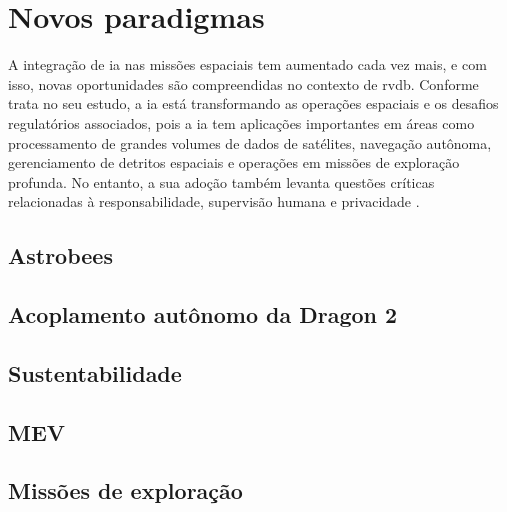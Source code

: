 \section{Novos paradigmas}

A integração de \gls{ia} nas missões espaciais tem aumentado cada vez mais, e com isso, novas oportunidades são compreendidas no contexto de \gls{rvdb}. 
Conforme \cite{martin2021} trata no seu estudo, a \gls{ia} está transformando as operações espaciais e os desafios regulatórios associados, pois a \gls{ia} tem aplicações importantes em áreas como processamento de grandes volumes de dados de satélites, navegação autônoma, gerenciamento de detritos espaciais e operações em missões de exploração profunda.
No entanto, a sua adoção também levanta questões críticas relacionadas à responsabilidade, supervisão humana e privacidade \cite{martin2021}.



\subsection{Astrobees}


\subsection{Acoplamento autônomo da Dragon 2}


\subsection{Sustentabilidade}


\subsection{MEV}


\subsection{Missões de exploração}

